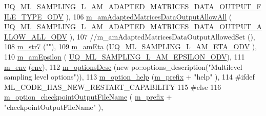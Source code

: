 \begin{DoxyCode}
      \hyperlink{_m_l_sampling_level_options_8h_a58a3b9fb9d4b5590390dd9aa650ed6da}{UQ\_ML\_SAMPLING\_L\_AM\_ADAPTED\_MATRICES\_DATA\_OUTPUT\_FILE\_TYPE\_ODV}
      ),
106   \hyperlink{class_q_u_e_s_o_1_1_m_l_sampling_level_options_ad1ac51fd4b35c5decca04048ebeca3f2}{m\_amAdaptedMatricesDataOutputAllowAll}      (
      \hyperlink{_m_l_sampling_level_options_8h_a638396364b16987b66f56caab789797a}{UQ\_ML\_SAMPLING\_L\_AM\_ADAPTED\_MATRICES\_DATA\_OUTPUT\_ALLOW\_ALL\_ODV}
      ),
107 \textcolor{comment}{//m\_amAdaptedMatricesDataOutputAllowedSet    (),}
108   \hyperlink{class_q_u_e_s_o_1_1_m_l_sampling_level_options_a062489e53dd259c548d7ea9ed9428377}{m\_str7}                                     (\textcolor{stringliteral}{""}),
109   \hyperlink{class_q_u_e_s_o_1_1_m_l_sampling_level_options_a87fe9b1c390bf7bff2ecc329064e7618}{m\_amEta}                                    (\hyperlink{_m_l_sampling_level_options_8h_ac1cfad0fa55ddffdc92bd25e49c174d1}{UQ\_ML\_SAMPLING\_L\_AM\_ETA\_ODV}
      ),
110   \hyperlink{class_q_u_e_s_o_1_1_m_l_sampling_level_options_abf07f60a5115657e18d39a586a8093ac}{m\_amEpsilon}                                (
      \hyperlink{_m_l_sampling_level_options_8h_a705e000d7df8fde969fb5e2587fceab4}{UQ\_ML\_SAMPLING\_L\_AM\_EPSILON\_ODV}),
111   \hyperlink{class_q_u_e_s_o_1_1_m_l_sampling_level_options_a5bdc1fb3f6eb46f73feec9c356c9a1b8}{m\_env}                                      (\hyperlink{class_q_u_e_s_o_1_1_m_l_sampling_level_options_afd8e8e8ba3c116b9a17b1d2497daaa1d}{env}),
112   \hyperlink{class_q_u_e_s_o_1_1_m_l_sampling_level_options_a7a3b7a94c7ae6a592f1744f19c74e2a2}{m\_optionsDesc}                              (\textcolor{keyword}{new} po::options\_description(\textcolor{stringliteral}{"Multilevel sampling
       level options"})),
113   \hyperlink{class_q_u_e_s_o_1_1_m_l_sampling_level_options_a5f29394c92a49c24e9c2725320ee3406}{m\_option\_help}                                      (\hyperlink{class_q_u_e_s_o_1_1_m_l_sampling_level_options_a4423067de3fa689d820abeba4dc5babc}{m\_prefix} + \textcolor{stringliteral}{"help"}               
                             ),
114 \textcolor{preprocessor}{#ifdef ML\_CODE\_HAS\_NEW\_RESTART\_CAPABILITY}
115 \textcolor{preprocessor}{}\textcolor{preprocessor}{#else}
116 \textcolor{preprocessor}{}  \hyperlink{class_q_u_e_s_o_1_1_m_l_sampling_level_options_ab0b21922a976c557cdcded05fcbb9a54}{m\_option\_checkpointOutputFileName}                  (
      \hyperlink{class_q_u_e_s_o_1_1_m_l_sampling_level_options_a4423067de3fa689d820abeba4dc5babc}{m\_prefix} + \textcolor{stringliteral}{"checkpointOutputFileName"}                  ),

\end{DoxyCode}
